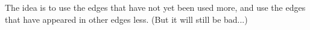         The idea is to use the edges that have not yet been used more, and use the edges that have appeared in other edges less. (But it will still be bad...)
    




